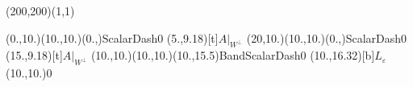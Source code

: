 \unitlength=1bp%

\begin{feynartspicture}(200,200)(1,1)

\FADiagram{}
\FAProp(0.,10.)(10.,10.)(0.,){ScalarDash}{0}
\FALabel(5.,9.18)[t]{$A|_{W^\perp}$}
\FAProp(20,10.)(10.,10.)(0.,){ScalarDash}{0}
\FALabel(15.,9.18)[t]{$A|_{W^\perp}$}
\FAProp(10.,10.)(10.,10.)(10.,15.5){BandScalarDash}{0}
\FALabel(10.,16.32)[b]{$L_\varepsilon$}
\FAVert(10.,10.){0}
\end{feynartspicture}


